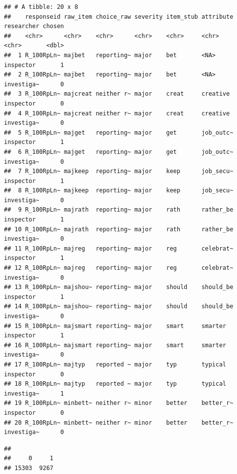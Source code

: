 \documentclass[
]{article}
\newenvironment{Shaded}{\begin{snugshade}}{\end{snugshade}}
\newcommand{\AttributeTok}[1]{\textcolor[rgb]{0.13,0.29,0.53}{#1}}
\newcommand{\FunctionTok}[1]{\textcolor[rgb]{0.13,0.29,0.53}{\textbf{#1}}}
\newcommand{\NormalTok}[1]{#1}
\newcommand{\SpecialCharTok}[1]{\textcolor[rgb]{0.81,0.36,0.00}{\textbf{#1}}}
\newcommand{\StringTok}[1]{\textcolor[rgb]{0.31,0.60,0.02}{#1}}
\begin{document}
\begin{verbatim}
## # A tibble: 20 x 8
##    responseid raw_item choice_raw severity item_stub attribute researcher chosen
##    <chr>      <chr>    <chr>      <chr>    <chr>     <chr>     <chr>       <dbl>
##  1 R_100RpLn~ majbet   reporting~ major    bet       <NA>      inspector       1
##  2 R_100RpLn~ majbet   reporting~ major    bet       <NA>      investiga~      0
##  3 R_100RpLn~ majcreat neither r~ major    creat     creative  inspector       0
##  4 R_100RpLn~ majcreat neither r~ major    creat     creative  investiga~      0
##  5 R_100RpLn~ majget   reporting~ major    get       job_outc~ inspector       1
##  6 R_100RpLn~ majget   reporting~ major    get       job_outc~ investiga~      0
##  7 R_100RpLn~ majkeep  reporting~ major    keep      job_secu~ inspector       1
##  8 R_100RpLn~ majkeep  reporting~ major    keep      job_secu~ investiga~      0
##  9 R_100RpLn~ majrath  reporting~ major    rath      rather_be inspector       1
## 10 R_100RpLn~ majrath  reporting~ major    rath      rather_be investiga~      0
## 11 R_100RpLn~ majreg   reporting~ major    reg       celebrat~ inspector       1
## 12 R_100RpLn~ majreg   reporting~ major    reg       celebrat~ investiga~      0
## 13 R_100RpLn~ majshou~ reporting~ major    should    should_be inspector       1
## 14 R_100RpLn~ majshou~ reporting~ major    should    should_be investiga~      0
## 15 R_100RpLn~ majsmart reporting~ major    smart     smarter   inspector       1
## 16 R_100RpLn~ majsmart reporting~ major    smart     smarter   investiga~      0
## 17 R_100RpLn~ majtyp   reported ~ major    typ       typical   inspector       0
## 18 R_100RpLn~ majtyp   reported ~ major    typ       typical   investiga~      1
## 19 R_100RpLn~ minbett~ neither r~ minor    better    better_r~ inspector       0
## 20 R_100RpLn~ minbett~ neither r~ minor    better    better_r~ investiga~      0
\end{verbatim}

\begin{Shaded}
\end{Shaded}

\begin{verbatim}
## 
##     0     1 
## 15303  9267
\end{verbatim}
\end{document}
